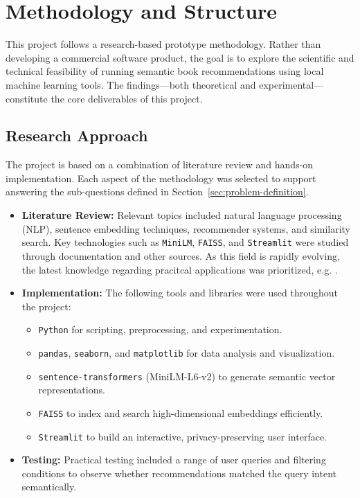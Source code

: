 \chapter{Methodology and Structure}
\label{chapter:methodology}

This project follows a research-based prototype methodology. 
Rather than developing a commercial software product, the goal is to explore the scientific and 
technical feasibility of running semantic book recommendations using local machine learning tools.
The findings—both theoretical and experimental—constitute the core deliverables of this project.

\section{Research Approach}
\label{sec:research-approach}

The project is based on a combination of literature review and hands-on implementation. 
Each aspect of the methodology was selected to support answering the sub-questions defined in Section~\ref{sec:problem-definition}.

\begin{itemize}
    \item \textbf{Literature Review:} Relevant topics included natural language processing (NLP), sentence embedding techniques, 
    recommender systems, and similarity search. Key technologies such as \texttt{MiniLM}, \texttt{FAISS}, 
    and \texttt{Streamlit} were studied through documentation and other sources. As this field is rapidly evolving,
    the latest knowledge regarding pracitcal applications was prioritized, e.g. \cite{handson-ml}.
    
    \item \textbf{Implementation:} The following tools and libraries were used throughout the project:
    \begin{itemize}
        \item \texttt{Python} for scripting, preprocessing, and experimentation.
        \item \texttt{pandas}, \texttt{seaborn}, and \texttt{matplotlib} for data analysis and visualization.
        \item \texttt{sentence-transformers} (MiniLM-L6-v2) to generate semantic vector representations.
        \item \texttt{FAISS} to index and search high-dimensional embeddings efficiently.
        \item \texttt{Streamlit} to build an interactive, privacy-preserving user interface.
    \end{itemize}
    
    \item \textbf{Testing:} Practical testing included a range of user queries and filtering conditions to observe whether recommendations matched the query intent semantically.
\end{itemize}

